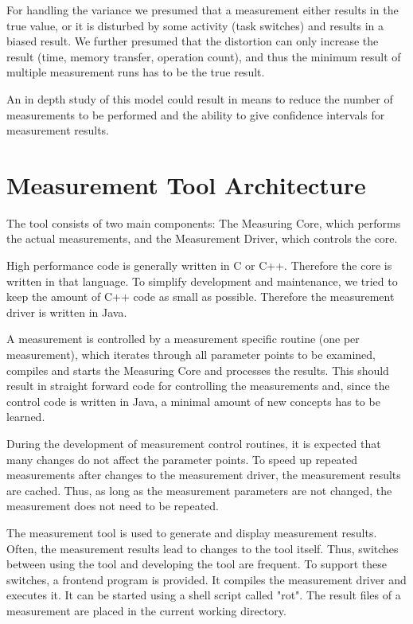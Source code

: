 \documentclass[a4paper,12pt]{article}
\begin{document}
For handling the variance we presumed that a measurement either results in the
true value, or it is disturbed by some activity (task switches) and results in a
biased result. We further presumed that the distortion can only increase the
result (time, memory transfer, operation count), and thus the minimum result of
multiple measurement runs has to be the true result.

An in depth study of this model could result in means to reduce the number of
measurements to be performed and the ability to give confidence intervals for
measurement results.

\clearpage
\appendix
\section{Measurement Tool Architecture}
The tool consists of two main components: The Measuring Core, which performs the
actual measurements, and the Measurement Driver, which controls the core.

High performance code is generally written in C or C++. Therefore the core is
written in that language. To simplify development and maintenance, we tried to
keep the amount of C++ code as small as possible. Therefore the measurement
driver is written in Java.

A measurement is controlled by a measurement specific
routine (one per measurement), which iterates through all parameter points to be examined,
compiles and starts the Measuring Core and processes the results. This should
result in straight forward code for controlling the measurements and, since the
control code is written in Java, a minimal amount of new concepts has to be
learned.

During the development of measurement control routines, it is expected that many
changes do not affect the parameter points. To speed up repeated measurements
after changes to the measurement driver, the measurement results are cached.
Thus, as long as the measurement parameters are not changed, the measurement
does not need to be repeated.

The measurement tool is used to generate and display measurement results. Often,
the measurement results lead to changes to the tool itself. Thus, switches
between using the tool and developing the tool are frequent. To support these
switches, a frontend program is provided. It compiles the measurement driver and
executes it. It can be started using a shell script called "rot". The result
files of a measurement are placed in the current working directory.
\end{document}
